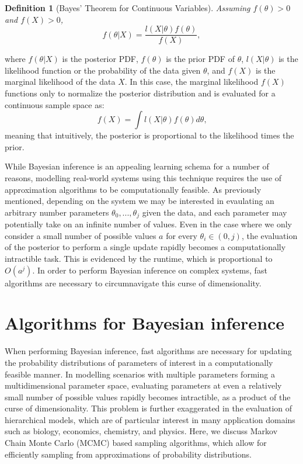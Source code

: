 \documentclass[
  12pt,
]{book}
\theoremstyle{definition}
\newtheorem{definition}{Definition}[chapter]
\theoremstyle{definition}
\theoremstyle{definition}
\theoremstyle{remark}
\begin{document}
\begin{definition}[Bayes' Theorem for Continuous Variables]
\protect\hypertarget{def:bayesprob}{}{\label{def:bayesprob} {} }\emph{Assuming \(f(\theta)>0\) and \(f(X)>0\),}
\[f(\theta|X)=\frac{l(X|\theta)f(\theta)}{f(X)},\]
\end{definition}
where \(f(\theta|X)\) is the posterior PDF, \(f(\theta)\) is the prior PDF of \(\theta\), \(l(X|\theta)\) is the likelihood function or the probability of the data given \(\theta\), and \(f(X)\) is the marginal likelihood of the data \(X\).
In this case, the marginal likelihood \(f(X)\) functions only to normalize the posterior distribution and is evaluated for a continuous sample space as:
\[f(X)=\int l(X|\theta)f(\theta)d\theta \textrm{,}\]
meaning that intuitively, the posterior is proportional to the likelihood times the prior.

While Bayesian inference is an appealing learning schema for a number of reasons, modelling real-world systems using this technique requires the use of approximation algorithms to be computationally feasible.
As previously mentioned, depending on the system we may be interested in evaulating an arbitrary number parameters \(\theta_0, ..., \theta_j\) given the data, and each parameter may potentially take on an infinite number of values.
Even in the case where we only consider a small number of possible values \(a\) for every \(\theta_i \in (0,j)\), the evaluation of the posterior to perform a single update rapidly becomes a computationally intractible task.
This is evidenced by the runtime, which is proportional to \(O(a^{j})\).
In order to perform Bayesian inference on complex systems, fast algorithms are necessary to circumnavigate this curse of dimensionality.

\hypertarget{algorithms-for-bayesian-inference}{%
\chapter{Algorithms for Bayesian inference}\label{algorithms-for-bayesian-inference}}

When performing Bayesian inference, fast algorithms are necessary for updating the probability distributions of parameters of interest in a computationally feasible manner.
In modelling scenarios with multiple parameters forming a multidimensional parameter space, evaluating parameters at even a relatively small number of possible values rapidly becomes intractible, as a product of the curse of dimensionality.
This problem is further exaggerated in the evaluation of hierarchical models, which are of particular interest in many application domains such as biology, economics, chemistry, and physics.
Here, we discuss Markov Chain Monte Carlo (MCMC) based sampling algorithms, which allow for efficiently sampling from approximations of probability distributions.
\end{document}
